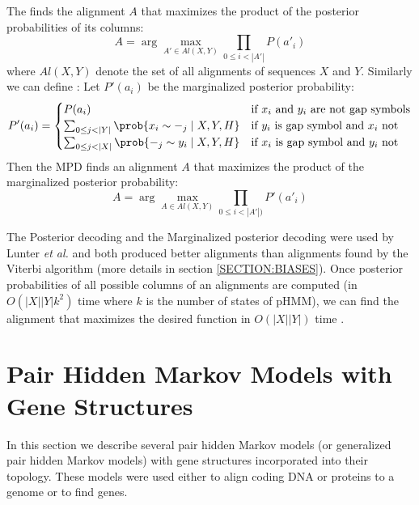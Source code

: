 The  finds the alignment $A$ that maximizes
the product of the posterior probabilities of its columns: 
\[A = \arg\max_{A'\in Al(X,Y)}\prod_{0\leq i <
|A'|}P(a'_i)\] where $Al(X,Y)$ denote the set of all  alignments of sequences
$X$ and $Y$. Similarly we can define : Let $P'(a_i)$ be the marginalized posterior probability:
\[
P'(a_i) = \begin{cases}
P(a_i) & \text{if $x_i$ and $y_i$ are not gap symbols}\\
\sum_{0\leq j < |Y|}\prob{x_i\sim -_{j}\mid X,Y,H}  & \text{if $y_i$ is gap symbol and $x_i$ not}\\
\sum_{0\leq j < |X|} \prob{-_{j}\sim y_i\mid X,Y,H}  & \text{if $x_i$ is gap symbol and $y_i$ not}
\end{cases}
\]
Then the MPD finds an alignment $A$ that maximizes the product of the
marginalized posterior probability:
\[A = \arg\max_{A\in Al(X,Y)}\prod_{0\leq i < |A'|)}P'(a'_i)\] 

The Posterior decoding and the Marginalized posterior decoding were used by
Lunter {\it et al.} and both produced better alignments than alignments found
by the Viterbi algorithm (more details in section \ref{SECTION:BIASES}). Once posterior probabilities of all possible columns of an
alignments are computed (in $O(|X||Y|k^2)$ time where $k$ is the number of
states of pHMM), we can find the alignment that maximizes the desired
function in $O(|X||Y|)$ time \cite{Lunter2008}. 



\section{Pair Hidden Markov Models with Gene Structures}

In this section we describe several pair hidden Markov models (or generalized
pair hidden Markov models) with gene structures incorporated into their
topology. These models were used either to align coding DNA or proteins
to a genome or to find genes.



